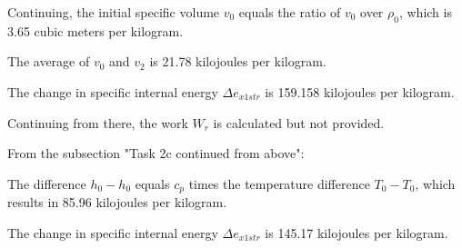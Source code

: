 Continuing, the initial specific volume \( v_0 \) equals the ratio of \( v_0 \) over \( \rho_0 \), which is 3.65 cubic meters per kilogram.

The average of \( v_0 \) and \( v_2 \) is 21.78 kilojoules per kilogram.

The change in specific internal energy \( \Delta e_{x1str} \) is 159.158 kilojoules per kilogram.

Continuing from there, the work \( W_r \) is calculated but not provided.

From the subsection "Task 2c continued from above":

The difference \( h_0 - h_0 \) equals \( c_p \) times the temperature difference \( T_0 - T_0 \), which results in 85.96 kilojoules per kilogram.

The change in specific internal energy \( \Delta e_{x1str} \) is 145.17 kilojoules per kilogram.